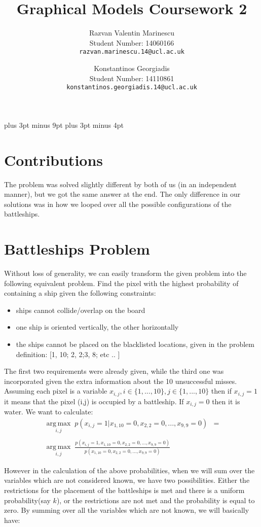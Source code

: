 \documentclass[11pt,a4paper,oneside]{report}
\title{Graphical Models Coursework 2}
\author{
    Razvan Valentin Marinescu\\
    Student Number: 14060166\\
  \texttt{razvan.marinescu.14@ucl.ac.uk}
  \and
    Konstantinos Georgiadis\\
    Student Number: 14110861\\
  \texttt{konstantinos.georgiadis.14@ucl.ac.uk}
}
\begin{document}
\belowdisplayskip=12pt plus 3pt minus 9pt
\belowdisplayshortskip=7pt plus 3pt minus 4pt

\maketitle{}

\section*{Contributions}

The problem was solved slightly different by both of us (in an independent manner), but we got the same answer at the end. The only difference in our solutions was in how we looped over all the possible configurations of the battleships. 

\section*{Battleships Problem}
Without loss of generality, we can easily transform the given problem into the following equivalent problem. Find the pixel with the highest probability of containing a ship given the following constraints:
\begin{itemize}
\item ships cannot collide/overlap on the board
\item one ship is oriented vertically, the other horizontally
\item the ships cannot be placed on the blacklisted locations, given in the problem definition: [1, 10; 2, 2;3, 8; etc .. ]
\end{itemize}
The first two requirements were already given, while the third one was incorporated given the extra information about the 10 unsuccessful misses. Assuming each pixel is a variable $x_{i,j},i\in \{1,...,10\},j\in \{1,...,10\}$ then if $x_{i,j}=1$ it means that the pixel (i,j) is occupied by a battleship. If $x_{i,j}=0$ then it is water. We want to calculate:\\

\begin{align*}
\operatorname*{arg\,max}_{i,j}\;p(x_{i,j}=1|x_{1,10}=0,x_{2,2}=0,...,x_{9,9}=0)&=\\\\
\operatorname*{arg\,max}_{i,j}\;\frac{p(x_{i,j}=1,x_{1,10}=0,x_{2,2}=0,...,x_{9,9}=0)}{p(x_{1,10}=0,x_{2,2}=0,...,x_{9,9}=0)}&
\end{align*}

However in the calculation of the above probabilities, when we will sum over the variables which are not considered known, we have two possibilities. Either the restrictions for the placement of the battleships is met and there is a uniform probability(say $k$), or the restrictions are not met and the probability is equal to zero. By summing over all the variables which are not known, we will basically have:
\end{document}
